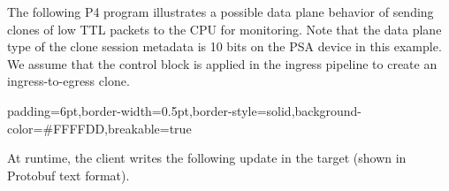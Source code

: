 \documentclass[11pt]{article}
\begin{document}
{%
The following P4 program illustrates a possible data plane behavior of sending
clones of low TTL packets to the CPU for monitoring. Note that the data plane
type of the clone session metadata is 10 bits on the PSA device in this example.
We assume that the  control block is applied in the ingress
pipeline to create an ingress-to-egress clone.%

\begin{mdbmargintb}{6pt}{6pt}%
\begin{mdblock}{padding=6pt,border-width=0.5pt,border-style=solid,background-color=\#FFFFDD,breakable=true}%
\begin{mdpre}%
\end{mdpre}%
\end{mdblock}%
\end{mdbmargintb}%

\noindent{}At runtime, the client writes the following update in the target (shown in
Protobuf text format).%

}
\end{document}
